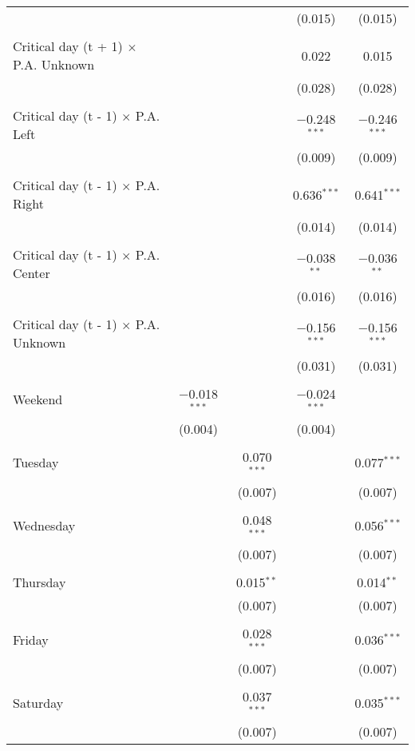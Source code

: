 \documentclass[
]{article}
\begin{document}
\begin{table}[!htbp]
{\begin{tabular}{@{\extracolsep{5pt}}lcccc}
  &  &  & (0.015) & (0.015) \\ 
  & & & & \\ 
 Critical day (t + 1) $\times$ P.A. Unknown &  &  & 0.022 & 0.015 \\ 
  &  &  & (0.028) & (0.028) \\ 
  & & & & \\ 
 Critical day (t - 1) $\times$ P.A. Left &  &  & $-$0.248$^{***}$ & $-$0.246$^{***}$ \\ 
  &  &  & (0.009) & (0.009) \\ 
  & & & & \\ 
 Critical day (t - 1) $\times$ P.A. Right &  &  & 0.636$^{***}$ & 0.641$^{***}$ \\ 
  &  &  & (0.014) & (0.014) \\ 
  & & & & \\ 
 Critical day (t - 1) $\times$ P.A. Center &  &  & $-$0.038$^{**}$ & $-$0.036$^{**}$ \\ 
  &  &  & (0.016) & (0.016) \\ 
  & & & & \\ 
 Critical day (t - 1) $\times$ P.A. Unknown &  &  & $-$0.156$^{***}$ & $-$0.156$^{***}$ \\ 
  &  &  & (0.031) & (0.031) \\ 
  & & & & \\ 
 Weekend & $-$0.018$^{***}$ &  & $-$0.024$^{***}$ &  \\ 
  & (0.004) &  & (0.004) &  \\ 
  & & & & \\ 
 Tuesday &  & 0.070$^{***}$ &  & 0.077$^{***}$ \\ 
  &  & (0.007) &  & (0.007) \\ 
  & & & & \\ 
 Wednesday &  & 0.048$^{***}$ &  & 0.056$^{***}$ \\ 
  &  & (0.007) &  & (0.007) \\ 
  & & & & \\ 
 Thursday &  & 0.015$^{**}$ &  & 0.014$^{**}$ \\ 
  &  & (0.007) &  & (0.007) \\ 
  & & & & \\ 
 Friday &  & 0.028$^{***}$ &  & 0.036$^{***}$ \\ 
  &  & (0.007) &  & (0.007) \\ 
  & & & & \\ 
 Saturday &  & 0.037$^{***}$ &  & 0.035$^{***}$ \\ 
  &  & (0.007) &  & (0.007) \\ 

\end{tabular}}
\end{table}
\end{document}

